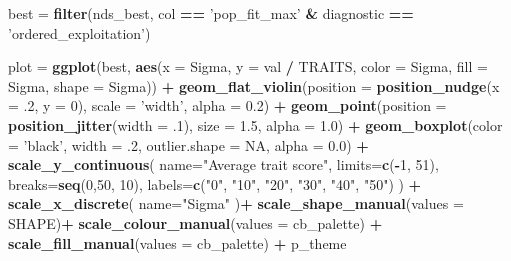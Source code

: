 \documentclass[]{book}
\newenvironment{Shaded}{\begin{snugshade}}{\end{snugshade}}
\newcommand{\DataTypeTok}[1]{\textcolor[rgb]{0.13,0.29,0.53}{#1}}
\newcommand{\DecValTok}[1]{\textcolor[rgb]{0.00,0.00,0.81}{#1}}
\newcommand{\FloatTok}[1]{\textcolor[rgb]{0.00,0.00,0.81}{#1}}
\newcommand{\KeywordTok}[1]{\textcolor[rgb]{0.13,0.29,0.53}{\textbf{#1}}}
\newcommand{\NormalTok}[1]{#1}
\newcommand{\OperatorTok}[1]{\textcolor[rgb]{0.81,0.36,0.00}{\textbf{#1}}}
\newcommand{\OtherTok}[1]{\textcolor[rgb]{0.56,0.35,0.01}{#1}}
\newcommand{\StringTok}[1]{\textcolor[rgb]{0.31,0.60,0.02}{#1}}
\begin{document}
\begin{Shaded}
\begin{Highlighting}[]
\NormalTok{best =}\StringTok{ }\KeywordTok{filter}\NormalTok{(nds_best, col }\OperatorTok{==}\StringTok{ 'pop_fit_max'} \OperatorTok{&}\StringTok{ }\NormalTok{diagnostic }\OperatorTok{==}\StringTok{ 'ordered_exploitation'}\NormalTok{)}

\NormalTok{plot =}\StringTok{ }\KeywordTok{ggplot}\NormalTok{(best, }\KeywordTok{aes}\NormalTok{(}\DataTypeTok{x =}\NormalTok{ Sigma, }\DataTypeTok{y =}\NormalTok{ val }\OperatorTok{/}\StringTok{ }\NormalTok{TRAITS, }\DataTypeTok{color =}\NormalTok{ Sigma, }\DataTypeTok{fill =}\NormalTok{ Sigma, }\DataTypeTok{shape =}\NormalTok{ Sigma)) }\OperatorTok{+}
\StringTok{  }\KeywordTok{geom_flat_violin}\NormalTok{(}\DataTypeTok{position =} \KeywordTok{position_nudge}\NormalTok{(}\DataTypeTok{x =} \FloatTok{.2}\NormalTok{, }\DataTypeTok{y =} \DecValTok{0}\NormalTok{), }\DataTypeTok{scale =} \StringTok{'width'}\NormalTok{, }\DataTypeTok{alpha =} \FloatTok{0.2}\NormalTok{) }\OperatorTok{+}
\StringTok{  }\KeywordTok{geom_point}\NormalTok{(}\DataTypeTok{position =} \KeywordTok{position_jitter}\NormalTok{(}\DataTypeTok{width =} \FloatTok{.1}\NormalTok{), }\DataTypeTok{size =} \FloatTok{1.5}\NormalTok{, }\DataTypeTok{alpha =} \FloatTok{1.0}\NormalTok{) }\OperatorTok{+}
\StringTok{  }\KeywordTok{geom_boxplot}\NormalTok{(}\DataTypeTok{color =} \StringTok{'black'}\NormalTok{, }\DataTypeTok{width =} \FloatTok{.2}\NormalTok{, }\DataTypeTok{outlier.shape =} \OtherTok{NA}\NormalTok{, }\DataTypeTok{alpha =} \FloatTok{0.0}\NormalTok{) }\OperatorTok{+}
\StringTok{  }\KeywordTok{scale_y_continuous}\NormalTok{(}
    \DataTypeTok{name=}\StringTok{"Average trait score"}\NormalTok{,}
    \DataTypeTok{limits=}\KeywordTok{c}\NormalTok{(}\OperatorTok{-}\DecValTok{1}\NormalTok{, }\DecValTok{51}\NormalTok{),}
    \DataTypeTok{breaks=}\KeywordTok{seq}\NormalTok{(}\DecValTok{0}\NormalTok{,}\DecValTok{50}\NormalTok{, }\DecValTok{10}\NormalTok{),}
    \DataTypeTok{labels=}\KeywordTok{c}\NormalTok{(}\StringTok{"0"}\NormalTok{, }\StringTok{"10"}\NormalTok{, }\StringTok{"20"}\NormalTok{, }\StringTok{"30"}\NormalTok{, }\StringTok{"40"}\NormalTok{, }\StringTok{"50"}\NormalTok{)}
\NormalTok{  ) }\OperatorTok{+}
\StringTok{  }\KeywordTok{scale_x_discrete}\NormalTok{(}
    \DataTypeTok{name=}\StringTok{"Sigma"}
\NormalTok{  )}\OperatorTok{+}
\StringTok{  }\KeywordTok{scale_shape_manual}\NormalTok{(}\DataTypeTok{values =}\NormalTok{ SHAPE)}\OperatorTok{+}
\StringTok{  }\KeywordTok{scale_colour_manual}\NormalTok{(}\DataTypeTok{values =}\NormalTok{ cb_palette) }\OperatorTok{+}
\StringTok{  }\KeywordTok{scale_fill_manual}\NormalTok{(}\DataTypeTok{values =}\NormalTok{ cb_palette) }\OperatorTok{+}
\StringTok{  }\NormalTok{p_theme}


\end{Highlighting}
\end{Shaded}
\end{document}
